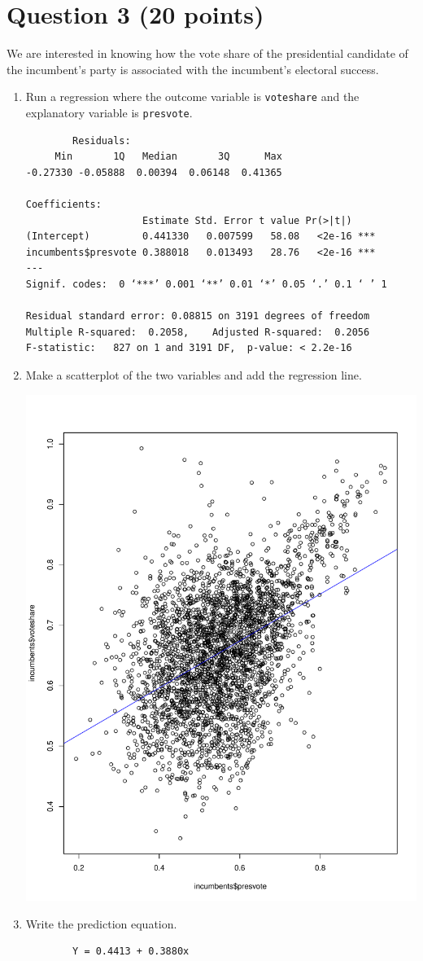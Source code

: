 \documentclass[12pt,letterpaper]{article}
\begin{document}
	\newpage	
\section*{Question 3 (20 points)}

\noindent We are interested in knowing how the vote share of the presidential candidate of the incumbent's party is associated with the incumbent's electoral success.
	\vspace{.25cm}
	\begin{enumerate}
		\item Run a regression where the outcome variable is \texttt{voteshare} and the explanatory variable is \texttt{presvote}.
			
			\begin{verbatim}
		Residuals:
     Min       1Q   Median       3Q      Max 
-0.27330 -0.05888  0.00394  0.06148  0.41365 

Coefficients:
                    Estimate Std. Error t value Pr(>|t|)    
(Intercept)         0.441330   0.007599   58.08   <2e-16 ***
incumbents$presvote 0.388018   0.013493   28.76   <2e-16 ***
---
Signif. codes:  0 ‘***’ 0.001 ‘**’ 0.01 ‘*’ 0.05 ‘.’ 0.1 ‘ ’ 1

Residual standard error: 0.08815 on 3191 degrees of freedom
Multiple R-squared:  0.2058,	Adjusted R-squared:  0.2056 
F-statistic:   827 on 1 and 3191 DF,  p-value: < 2.2e-16
			\end{verbatim}
			
		\item Make a scatterplot of the two variables and add the regression line. 
			
			\includegraphics[width=.75\textwidth]{plot_3.pdf}
			
		\item Write the prediction equation.
		\begin{verbatim}
		Y = 0.4413 + 0.3880x
		\end{verbatim}
	\end{enumerate}
	
\end{document}
